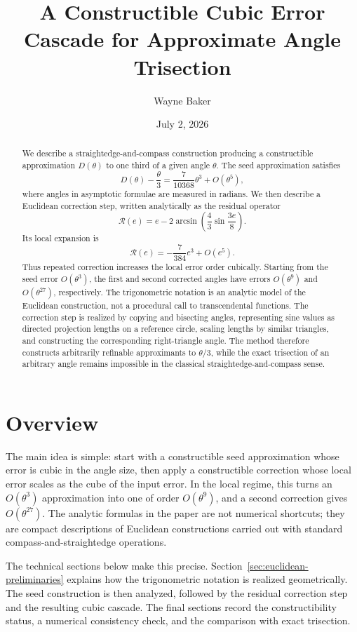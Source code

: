 \documentclass[11pt]{article}
\title{A Constructible Cubic Error Cascade for Approximate Angle Trisection}
\author{Wayne Baker}
\date{July 2, 2026}
\theoremstyle{remark}
\newcommand{\Rop}{\mathscr{R}}
\begin{document}
\maketitle

\begin{abstract}
We describe a straightedge-and-compass construction producing a constructible approximation
$D(\theta)$ to one third of a given angle $\theta$.  The seed approximation satisfies
\[
D(\theta)-\frac{\theta}{3}
=
\frac{7}{10368}\theta^3+O(\theta^5),
\]
where angles in asymptotic formulae are measured in radians.  We then describe a Euclidean
correction step, written analytically as the residual operator
\[
\Rop(e)
=
e
-
2\arcsin\!\left(
\frac43\sin\frac{3e}{8}
\right).
\]
Its local expansion is
\[
\Rop(e)
=
-\frac{7}{384}e^3+O(e^5).
\]
Thus repeated correction increases the local error order cubically.  Starting from
the seed error \(O(\theta^3)\), the first and second corrected angles have
errors \(O(\theta^9)\) and \(O(\theta^{27})\), respectively.  The
trigonometric notation is an analytic model of the Euclidean construction, not
a procedural call to transcendental functions.  The correction step is realized
by copying and bisecting angles, representing sine values as directed projection
lengths on a reference circle, scaling lengths by similar triangles, and
constructing the corresponding right-triangle angle.  The method therefore
constructs arbitrarily refinable approximants to \(\theta/3\), while the exact
trisection of an arbitrary angle remains impossible in the classical
straightedge-and-compass sense.
\end{abstract}

\section*{Overview}
\label{sec:overview}

The main idea is simple: start with a constructible seed approximation whose error is cubic in the angle size, then apply a constructible correction whose local error scales as the cube of the input error. In the local regime, this turns an \(O(\theta^3)\) approximation into one of order \(O(\theta^9)\), and a second correction gives \(O(\theta^{27})\). The analytic formulas in the paper are not numerical shortcuts; they are compact descriptions of Euclidean constructions carried out with standard compass-and-straightedge operations.

The technical sections below make this precise. Section~\ref{sec:euclidean-preliminaries} explains how the trigonometric notation is realized geometrically. The seed construction is then analyzed, followed by the residual correction step and the resulting cubic cascade. The final sections record the constructibility status, a numerical consistency check, and the comparison with exact trisection.
\end{document}
